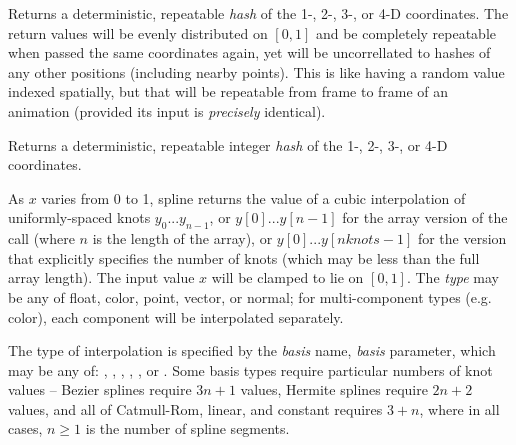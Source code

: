\documentclass[11pt,letterpaper]{book}
\def\color{{\cf color}\xspace}
\def\float{{\cf float}\xspace}
\def\normal{{\cf normal}\xspace}
\def\point{{\cf point}\xspace}
\def\vector{{\cf vector}\xspace}
\begin{document}
Returns a deterministic, repeatable \emph{hash} of the 1-, 2-, 3-, or
4-D coordinates.  The return values will be evenly
distributed on $[0,1]$ and be completely repeatable when passed the same
coordinates again, yet will be uncorrellated to hashes of any other
positions (including nearby points).  This is like having a random value
indexed spatially, but that will be repeatable from frame to frame of an
animation (provided its input is \emph{precisely} identical).
\apiend

Returns a deterministic, repeatable integer \emph{hash} of the 1-, 2-, 3-,
or 4-D coordinates.
\apiend


As $x$ varies from 0 to 1, {\cf spline} returns the value of a cubic
interpolation of uniformly-spaced knots $y_0$...$y_{n-1}$, or
$y[0]$...$y[n-1]$ for the array version of the call (where $n$ is the
length of the array), or $y[0]$...$y[nknots-1]$ for the version that
explicitly specifies the number of knots (which may be less than the
full array length).  The input value $x$ will be clamped to lie
on $[0,1]$.  The \emph{type} may be any of \float, \color,
\point, \vector, or \normal; for multi-component types (e.g. \color),
each component will be interpolated separately.

The type of interpolation is specified by the \emph{basis} name,
\emph{basis} parameter, which may be any of: ,
, , , , or 
. Some basis
types require particular numbers of knot values -- Bezier splines
require $3n+1$ values, Hermite splines require $2n+2$ values, and all of
Catmull-Rom, linear, and constant requires $3+n$, where in all cases,
$n \ge 1$ is the number of spline segments.
\end{document}
